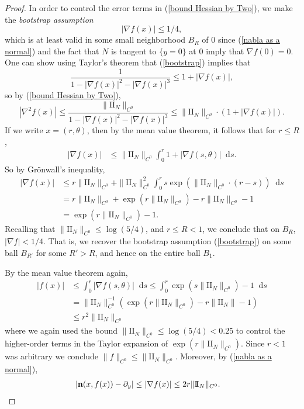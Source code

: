 \documentclass[final,12pt, leqno]{brownthesis}
\newcommand*\dif{\mathop{}\!\mathrm{d}}
\newcommand{\Two}{\mathrm{I\!I}}
\newcommand{\normal}{\mathbf n}
\newcommand{\dfn}[1]{\emph{#1}\index{#1}}
\theoremstyle{definition}
\numberwithin{equation}{section}
\begin{document}
\begin{proof}
	In order to control the error terms in (\ref{bound Hessian by Two}), we make the \dfn{bootstrap assumption}
\begin{equation}\label{bootstrap}
	|\nabla f(x)| \leq 1/4,
\end{equation}
	which is at least valid in some small neighborhood $B_R$ of $0$ since (\ref{nabla as a normal}) and the fact that $N$ is tangent to $\{y = 0\}$ at $0$ imply that $\nabla f(0) = 0$.
	One can show using Taylor's theorem that (\ref{bootstrap}) implies that 
	$$\frac{1}{1 - |\nabla f(x)|^2 - |\nabla f(x)|^3} \leq 1 + |\nabla f(x)|,$$
	so by (\ref{bound Hessian by Two}),
	$$|\nabla^2 f(x)| \leq \frac{\|\Two_N\|_{C^0}}{1 - |\nabla f(x)|^2 - |\nabla f(x)|^3} \leq \|\Two_N\|_{C^0} \cdot (1 + |\nabla f(x)|).$$
	If we write $x = (r, \theta)$, then by the mean value theorem, it follows that for $r \leq R$,
\begin{align*}
	|\nabla f(x)| &\leq \|\Two_N\|_{C^0} \int_0^r 1 + |\nabla f(s, \theta)| \dif s.
\end{align*}
	So by Gr\"onwall's inequality,
\begin{align*}
	|\nabla f(x)| &\leq r \|\Two_N\|_{C^0} + \|\Two_N\|_{C^0}^2 \int_0^r s \exp(\|\Two_N\|_{C^0} \cdot (r - s)) \dif s \\
	&= r \|\Two_N\|_{C^0} + \exp(r \|\Two_N\|_{C^0}) - r \|\Two_N\|_{C^0} - 1 \\
	&= \exp(r \|\Two_N\|_{C^0}) - 1.
\end{align*}
	Recalling that $\|\Two_N\|_{C^0} \leq \log(5/4)$, and $r \leq R < 1$, we conclude that on $B_R$, $|\nabla f| < 1/4$.
	That is, we recover the bootstrap assumption (\ref{bootstrap}) on some ball $B_{R'}$ for some $R' > R$, and hence on the entire ball $B_1$.

	By the mean value theorem again,
\begin{align*}
	|f(x)| &\leq \int_0^r |\nabla f(s, \theta)| \dif s \leq \int_0^r \exp(s \|\Two_N\|_{C^0}) - 1 \dif s \\
	&= \|\Two_N\|_{C^0}^{-1} (\exp(r \|\Two_N\|_{C^0}) - r\|\Two_N\| - 1) \\
	&\leq r^2 \|\Two_N\|_{C^0}
\end{align*}
	where we again used the bound $\|\Two_N\|_{C^0} \leq \log(5/4) < 0.25$ to control the higher-order terms in the Taylor expansion of $\exp(r \|\Two_N\|_{C^0})$. Since $r < 1$ was arbitrary we conclude $\|f\|_{C^0} \leq \|\Two_N\|_{C^0}$. Moreover, by (\ref{nabla as a normal}),
\begin{align*}
	|\normal(x, f(x)) - \partial_y| &\leq |\nabla f(x)| \leq 2r \|\Two_N\|_{C^0}. \qedhere
\end{align*}
\end{proof}
\end{document}
